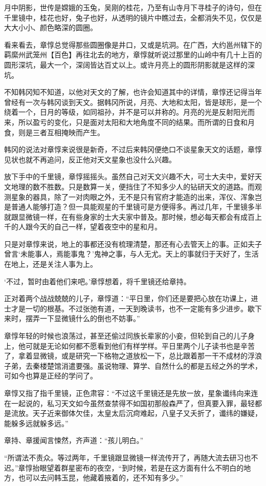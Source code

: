 月中阴影，世传是嫦娥的玉兔，吴刚的桂花，乃至有山寺月下寻桂子的诗句，但在千里镜中，桂花也好，兔子也好，从透明的镜片中瞧过去，全都消失不见，仅仅是大大小小、颜色略深的圆圈。

看来看去，章惇总觉得那些圆圈像是井口，又或是坑洞。在广西，大约邕州辖下的羁縻州武笼州【百色】再往北去的地方，章惇就听说过那里的山岭中有几十上百的圆形深坑，最大一个，深阔皆达百丈以上。或许月亮上的圆形阴影就是这样的深坑。

不知韩冈知不知道，以他对天文的了解，也许会知道其中的详情，章惇还记得当年曾经有一次与韩冈谈到天文。据韩冈所说，月亮、大地和太阳，皆是球形，是一个绕着一个，日月的等级，如同祖孙，并不是可以并称的。月亮的光是反射阳光而来，所以盈亏的变化，只是面对太阳和大地角度不同的结果。而所谓的日食和月食，则是三者互相掩映而产生。

韩冈的说法对章惇来说很是新奇，不过后来韩冈便绝口不谈星象天文的话题，章惇见状也就不再追问，反正他对天文星象也没什么兴趣。

放下手中的千里镜，章惇摇摇头。虽然自己对天文兴趣不大，可士大夫中，爱好天文地理的数不胜数。只是数算一关，便挡住了不知多少人的钻研天文的道路。而观测星象的器具，除了一对肉眼之外，无不是只有官府才能造的出来，浑仪、浑象岂是普通人能够打造？但一具能观星的千里镜可是方便得多。再过几年，千里镜多半就跟显微镜一样，在有些身家的士大夫家中普及。那时候，想必每天都会有成百上千的人跟今天的自己一样，望着夜空中的星和月。

只是对章惇来说，地上的事都还没有梳理清楚，那还有心去管天上的事。正如夫子曾言‘未能事人，焉能事鬼？’鬼神之事，与人无尤。天上的事就归于天好了，生活在地上，还是关注人事为上。

‘不过，暂时由着他们来吧。’章惇想着，将千里镜还给章持。

正对着两个战战兢兢的儿子，章惇道：“平日里，你们还是要把心放在功课上，进士才是一切的根基。不过张弛有道，一天到晚读书，也不一定能有多少进步。歇下来时，摆弄一下显微镜什么的倒也不妨事。”

章惇年轻的时候也浪荡过，甚至还偷过同族长辈家的小妾，但轮到自己的儿子身上，他可就是无论如何都不愿看到他们有样学样。平日里两个儿子读书也是辛苦了，拿着显微镜，或是研究一下格物之道放松一下，总比跟着那一干不成材的浮浪子弟，去秦楼楚馆消遣要强。虽说物理、算学、自然什么的都是五经之外的学术，可如今也算是正经的学问了。

章惇又指了指千里镜，正色肃容：“不过这千里镜还是先放一放，星象谶纬向来连在一起说的，私习天文如今虽然查禁得不如国初那般森严了，但真要入罪，最轻都是流放。天子近来御体欠佳，太皇太后沉疴难起，八皇子又夭折了，谶纬的嫌疑，能躲多远就躲多远。”

章持、章援闻言悚然，齐声道：“孩儿明白。”

“所谓法不责众。等过两年，千里镜跟显微镜一样流传开了，再随大流去研习也不迟。”章惇抬眼望着群星密布的夜空，“到时候，若是在这方面有什么不明白的地方，也可以去问韩玉昆，他藏着掖着的，还不知有多少。”

